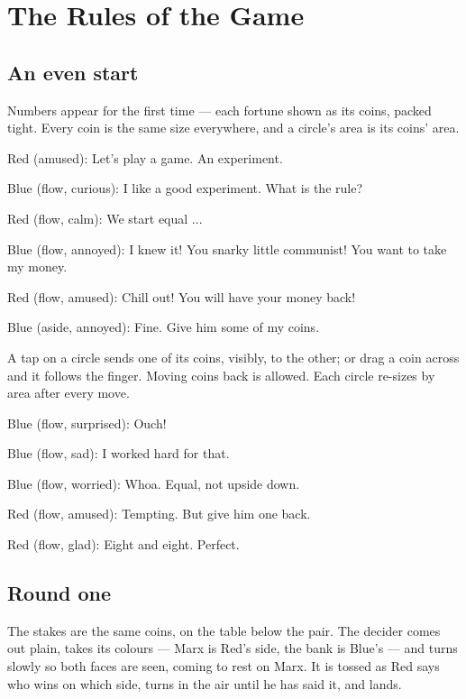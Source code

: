 \section{The Rules of the Game}\label{index:fair-game}

\subsection{An even start}\label{fair-game}

Numbers appear for the first time — each fortune shown as its coins, packed
tight. Every coin is the same size everywhere, and a circle's area is its
coins' area.

Red (amused): Let's play a game.
An experiment.

Blue (flow, curious): I like a good experiment.
What is the rule?

Red (flow, calm): We start equal ...


Blue (flow, annoyed): I knew it!
You snarky little communist!
You want to take my money.

Red (flow, amused): Chill out!
You will have your money back!


Blue (aside, annoyed): Fine. Give him some of my coins.
\equalize
{}

A tap on a circle sends one of its coins, visibly, to the other; or drag a
coin across and it follows the finger. Moving coins back is allowed. Each
circle re-sizes by area after every move.

Blue (flow, surprised): Ouch!

Blue (flow, sad): I worked hard for that.

Blue (flow, worried): Whoa. Equal, not upside down.

Red (flow, amused): Tempting. But give him one back.

Red (flow, glad): Eight and eight. Perfect.

\subsection{Round one}\label{round1}

The stakes are the same coins, on the table below the pair. The decider
comes out plain, takes its colours — Marx is Red's side, the bank is Blue's —
and turns slowly so both faces are seen, coming to rest on Marx. It is
tossed as Red says who wins on which side, turns in the air until he has
said it, and lands.

